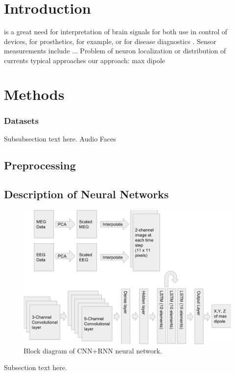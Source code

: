 \documentclass[journal]{IEEEtran}
\begin{document}
\section{Introduction}

 is a great need for interpretation of brain signals for both use in control of devices, for prosthetics, for example, or for disease diagnostics \cite{}. Sensor measurements include ...
Problem of neuron localization or distribution of currents
typical approaches
our approach: max dipole

\cite{gramfort2013meg}

\section{Methods}
\subsubsection{Datasets}
Subsubsection text here.
Audio
Faces
\subsection{Preprocessing}
\subsection{Description of Neural Networks}
\begin{figure}%
\centering
\includegraphics[width=7in]{cnnrnn}
\caption{Block diagram of CNN+RNN neural network.}
\label{fig_cnnrnn}
\end{figure}
Subsection text here.
\end{document}
